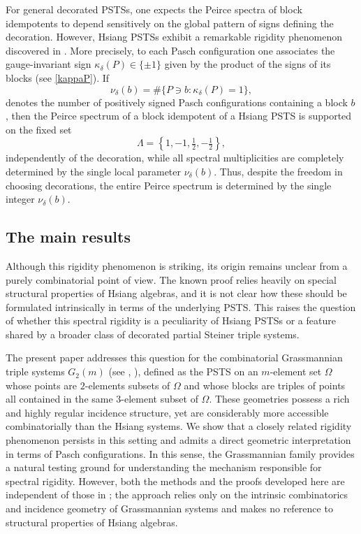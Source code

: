 \documentclass[times,11pt,reqno]{amsproc}
\theoremstyle{definition}
\numberwithin{equation}{section}
\begin{document}
For general decorated PSTSs, one expects the Peirce spectra of block idempotents to depend sensitively on the global pattern of signs
defining the decoration. However, Hsiang PSTSs exhibit a remarkable
rigidity phenomenon discovered in \cite{Fox-Tka2026b}. More precisely, to each Pasch
configuration one associates the gauge-invariant sign
$\kappa_\delta(P)\in\{\pm1\}$ given by the product of the signs of its blocks
(see \eqref{kappaP}). If
$$
\nu_\delta(b)
=
\#\{P\ni b:\kappa_\delta(P)=1\},
$$
denotes the number of positively signed Pasch configurations containing
a block $b$, then the Peirce spectrum of a block idempotent of a Hsiang PSTS is supported
on the fixed set
$$
\Lambda=
\left\{
1,-1,\tfrac12,-\tfrac12
\right\},
$$
independently of the decoration, while all spectral multiplicities are
completely determined by the single local parameter $\nu_\delta(b)$.
Thus, despite the freedom in choosing decorations, the entire Peirce spectrum is determined by the single integer $\nu_\delta(b)$.

\subsection{The main results}
Although this rigidity phenomenon is striking, its origin
remains unclear from a purely combinatorial point of view.
The known proof relies heavily on special structural properties of
Hsiang algebras, and it is not clear how these should be formulated
intrinsically in terms of the underlying PSTS.
This raises the question of whether this spectral rigidity is a peculiarity of Hsiang PSTSs or a feature shared by a broader class of decorated partial Steiner triple systems.


The present paper addresses this question for the combinatorial Grassmannian triple systems $G_2(m)$ (see \cite[Chapter $9.3$]{Brouwer-Cohen-Neumaier}, \cite{Prazmowska, Petelczyc-Prazmowska-Prazmowska, SanigaHolweckPracna}), defined as the PSTS on an $m$-element set $\Omega$ whose points are $2$-elements subsets of $\Omega$ and whose blocks are triples of points all contained in the same $3$-element subset of $\Omega$. These geometries possess a
rich and highly regular incidence structure, yet are considerably more
accessible combinatorially than the Hsiang systems. We show that a
closely related rigidity phenomenon persists in this setting and admits
a direct geometric interpretation in terms of Pasch
configurations. In this sense, the Grassmannian family provides a
natural testing ground for understanding the mechanism responsible for
spectral rigidity. However, both the
methods and the proofs developed here are independent of those
in \cite{Fox-Tka2026b}; the approach relies only on the intrinsic
combinatorics and incidence geometry of Grassmannian systems and makes no reference to
structural properties of Hsiang algebras.
\end{document}
